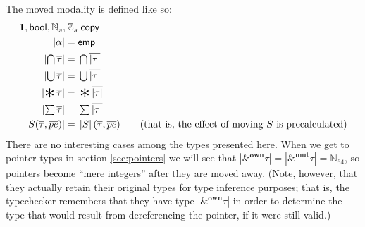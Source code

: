 \documentclass[acmsmall,nonacm]{acmart}
\DeclareMathOperator*{\Sep}{\scalerel*{\ast}{\sum}}
\newcommand*{\N}{\mathbb{N}}
\newcommand*{\Z}{\mathbb{Z}}
\newcommand{\core}[1]{\left| #1 \right|}
\begin{document}
The moved modality is defined like so:
\begin{align*}
  \mathbf{1}, \mathsf{bool},\N_s, \Z_s&\;\mathsf{copy}\\
  \core\alpha={}&\mathsf{emp}\\
  \core{\textstyle\bigcap\overline{\tau}}={}&\textstyle\bigcap\overline{\core\tau}\\
  \core{\textstyle\bigcup\overline{\tau}}={}&\textstyle\bigcup\overline{\core\tau}\\
  \core{\textstyle\Sep\overline{\tau}}={}&\textstyle\Sep\overline{\core\tau}\\
  \core{\textstyle\sum\overline{\tau}}={}&\textstyle\sum\overline{\core\tau}\\
  \core{S(\overline{\tau},\overline{pe})}={}&\core{S}(\overline{\tau},\overline{pe})\qquad\mbox{(that is, the effect of moving $S$ is precalculated)}
\end{align*}
There are no interesting cases among the types presented here. When we get to pointer types in section \ref{sec:pointers} we will see that $\core{\&^\mathbf{own}\tau}=\core{\&^\mathbf{mut}\tau}=\N_{64}$, so pointers become ``mere integers'' after they are moved away. (Note, however, that they actually retain their original types for type inference purposes; that is, the typechecker remembers that they have type $\core{\&^\mathbf{own}\tau}$ in order to determine the type that would result from dereferencing the pointer, if it were still valid.)
\end{document}
